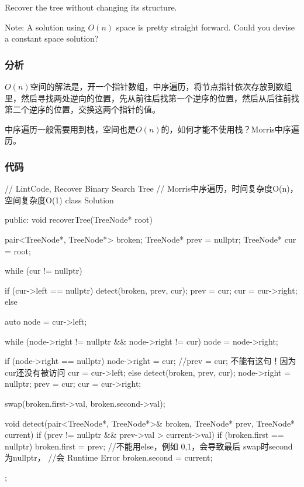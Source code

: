Recover the tree without changing its structure.

Note: A solution using $O(n)$ space is pretty straight forward. Could you devise a constant space solution?


\subsubsection{分析}
$O(n)$空间的解法是，开一个指针数组，中序遍历，将节点指针依次存放到数组里，然后寻找两处逆向的位置，先从前往后找第一个逆序的位置，然后从后往前找第二个逆序的位置，交换这两个指针的值。

中序遍历一般需要用到栈，空间也是$O(n)$的，如何才能不使用栈？Morris中序遍历。


\subsubsection{代码}

\begin{Code}
// LintCode, Recover Binary Search Tree
// Morris中序遍历，时间复杂度O(n)，空间复杂度O(1)
class Solution {
public:
    void recoverTree(TreeNode* root) {
        pair<TreeNode*, TreeNode*> broken;
        TreeNode* prev = nullptr;
        TreeNode* cur = root;

        while (cur != nullptr) {
            if (cur->left == nullptr) {
                detect(broken, prev, cur);
                prev = cur;
                cur = cur->right;
            } else {
                auto node = cur->left;

                while (node->right != nullptr && node->right != cur)
                    node = node->right;

                if (node->right == nullptr) {
                    node->right = cur;
                    //prev = cur; 不能有这句！因为cur还没有被访问
                    cur = cur->left;
                } else {
                    detect(broken, prev, cur);
                    node->right = nullptr;
                    prev = cur;
                    cur = cur->right;
                }
            }
        }

        swap(broken.first->val, broken.second->val);
    }

    void detect(pair<TreeNode*, TreeNode*>& broken, TreeNode* prev,
            TreeNode* current) {
        if (prev != nullptr && prev->val > current->val) {
            if (broken.first == nullptr) {
                broken.first = prev;
            } //不能用else，例如 {0,1}，会导致最后 swap时second为nullptr，
              //会 Runtime Error
            broken.second = current;
        }
    }
};
\end{Code}


